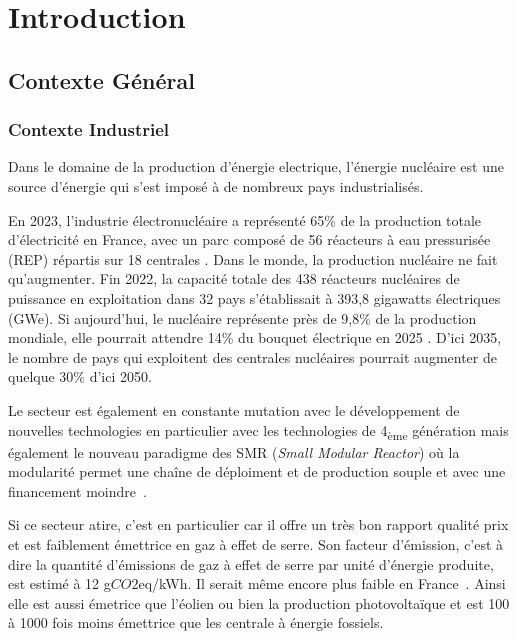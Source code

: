 
\chapter{Introduction}

\section*{Contexte Général}
\subsection*{Contexte Industriel}
Dans le domaine de la production d'énergie electrique, l'énergie nucléaire est une source d'énergie qui s'est imposé à de nombreux pays industrialisés.

En 2023, l'industrie électronucléaire a représenté 65\% de la production totale d'électricité en France, avec un parc composé de 56 réacteurs à eau pressurisée (REP) répartis sur 18 centrales \cite{rte2023}. Dans le monde, la production nucléaire ne fait qu'augmenter. Fin 2022, la capacité totale des 438 réacteurs nucléaires de puissance en exploitation dans 32 pays s’établissait à 393,8 gigawatts électriques (GWe). Si aujourd'hui, le nucléaire représente près de 9,8\% de la production mondiale, elle pourrait attendre 14\% du bouquet électrique en 2025 \cite{aiea2023}. D'ici 2035, le nombre de pays qui exploitent des centrales nucléaires pourrait augmenter de quelque 30\% d'ici 2050.

Le secteur est également en constante mutation avec le développement de nouvelles technologies en particulier avec les technologies de 4\textsubscript{ème} génération mais également le nouveau paradigme des SMR (\textit{Small Modular Reactor}) où la modularité permet une chaîne de déploiment et de production souple et avec une financement moindre~\cite{academie2022}.

Si ce secteur atire, c'est en particulier car il offre un très bon rapport qualité prix et est faiblement émettrice en gaz à effet de serre. Son facteur d'émission, c'est à dire la quantité d'émissions de gaz à effet de serre par unité d'énergie produite, est estimé à 12 g$CO2$eq/kWh. Il serait même encore plus faible en France~\cite{schlomer_technology-specific_nodate}. Ainsi elle est aussi émetrice que l'éolien ou bien la production photovoltaïque et est 100 à 1000 fois moins émettrice que les centrale à énergie fossiels.

